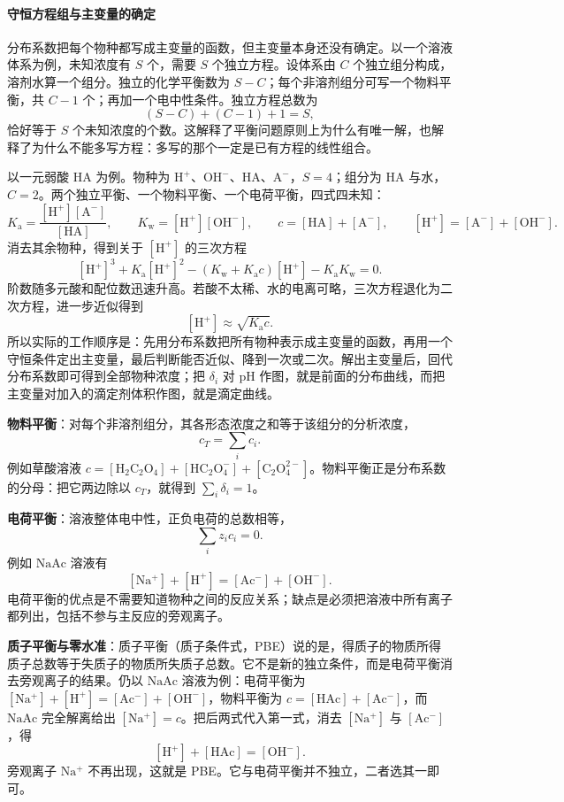 \documentclass[UTF8]{ctexbook}
\begin{document}
\label{sec:balance}
\paragraph{守恒方程组与主变量的确定}

分布系数把每个物种都写成主变量的函数，但主变量本身还没有确定。以一个溶液体系为例，未知浓度有 \(S\) 个，需要 \(S\) 个独立方程。设体系由 \(C\) 个独立组分构成，溶剂水算一个组分。独立的化学平衡数为 \(S-C\)；每个非溶剂组分可写一个物料平衡，共 \(C-1\) 个；再加一个电中性条件。独立方程总数为
\[
(S-C)+(C-1)+1=S,
\]
恰好等于 \(S\) 个未知浓度的个数。这解释了平衡问题原则上为什么有唯一解，也解释了为什么不能多写方程：多写的那个一定是已有方程的线性组合。

以一元弱酸 \(\mathrm{HA}\) 为例。物种为 \(\mathrm{H^+}\)、\(\mathrm{OH^-}\)、\(\mathrm{HA}\)、\(\mathrm{A^-}\)，\(S=4\)；组分为 \(\mathrm{HA}\) 与水，\(C=2\)。两个独立平衡、一个物料平衡、一个电荷平衡，四式四未知：
\[
K_{\mathrm{a}}=\frac{[\mathrm{H^+}][\mathrm{A^-}]}{[\mathrm{HA}]},
\qquad
K_{\mathrm{w}}=[\mathrm{H^+}][\mathrm{OH^-}],
\qquad
c=[\mathrm{HA}]+[\mathrm{A^-}],
\qquad
[\mathrm{H^+}]=[\mathrm{A^-}]+[\mathrm{OH^-}].
\]
消去其余物种，得到关于 \([\mathrm{H^+}]\) 的三次方程
\[
[\mathrm{H^+}]^3+K_{\mathrm{a}}[\mathrm{H^+}]^2
-\left(K_{\mathrm{w}}+K_{\mathrm{a}}c\right)[\mathrm{H^+}]
-K_{\mathrm{a}}K_{\mathrm{w}}=0 .
\]
阶数随多元酸和配位数迅速升高。若酸不太稀、水的电离可略，三次方程退化为二次方程，进一步近似得到
\[
[\mathrm{H^+}]\approx\sqrt{K_{\mathrm{a}}c}.
\]
所以实际的工作顺序是：先用分布系数把所有物种表示成主变量的函数，再用一个守恒条件定出主变量，最后判断能否近似、降到一次或二次。解出主变量后，回代分布系数即可得到全部物种浓度；把 \(\delta_i\) 对 \(\mathrm{pH}\) 作图，就是前面的分布曲线，而把主变量对加入的滴定剂体积作图，就是滴定曲线。

\textbf{物料平衡}：对每个非溶剂组分，其各形态浓度之和等于该组分的分析浓度，
\[
c_T=\sum_i c_i .
\]
例如草酸溶液 \(c=[\mathrm{H_2C_2O_4}]+[\mathrm{HC_2O_4^-}]+[\mathrm{C_2O_4^{2-}}]\)。物料平衡正是分布系数的分母：把它两边除以 \(c_T\)，就得到 \(\sum_i\delta_i=1\)。

\textbf{电荷平衡}：溶液整体电中性，正负电荷的总数相等，
\[
\sum_i z_i c_i=0 .
\]
例如 \(\mathrm{NaAc}\) 溶液有
\[
[\mathrm{Na^+}]+[\mathrm{H^+}]=[\mathrm{Ac^-}]+[\mathrm{OH^-}] .
\]
电荷平衡的优点是不需要知道物种之间的反应关系；缺点是必须把溶液中所有离子都列出，包括不参与主反应的旁观离子。

\textbf{质子平衡与零水准}：质子平衡（质子条件式，PBE）说的是，得质子的物质所得质子总数等于失质子的物质所失质子总数。它不是新的独立条件，而是电荷平衡消去旁观离子的结果。仍以 \(\mathrm{NaAc}\) 溶液为例：电荷平衡为 \([\mathrm{Na^+}]+[\mathrm{H^+}]=[\mathrm{Ac^-}]+[\mathrm{OH^-}]\)，物料平衡为 \(c=[\mathrm{HAc}]+[\mathrm{Ac^-}]\)，而 \(\mathrm{NaAc}\) 完全解离给出 \([\mathrm{Na^+}]=c\)。把后两式代入第一式，消去 \([\mathrm{Na^+}]\) 与 \([\mathrm{Ac^-}]\)，得
\[
[\mathrm{H^+}]+[\mathrm{HAc}]=[\mathrm{OH^-}] .
\]
旁观离子 \(\mathrm{Na^+}\) 不再出现，这就是 PBE。它与电荷平衡并不独立，二者选其一即可。
\end{document}
